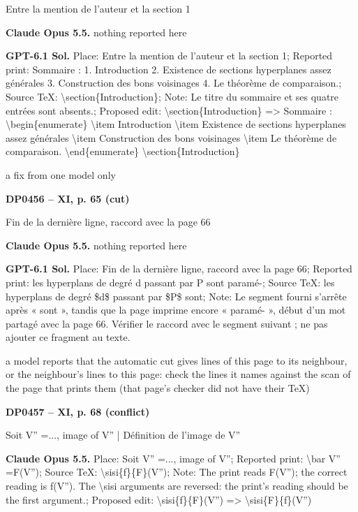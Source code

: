 Entre la mention de l'auteur et la section 1\par
\textbf{Claude Opus 5.5.} nothing reported here\par
\textbf{GPT-6.1 Sol.} Place: Entre la mention de l'auteur et la section 1; Reported print: Sommaire : 1. Introduction 2. Existence de sections hyperplanes assez générales 3. Construction des bons voisinages 4. Le théorème de comparaison.; Source TeX: \textbackslash{}section\{Introduction\}; Note: Le titre du sommaire et ses quatre entrées sont absents.; Proposed edit: \textbackslash{}section\{Introduction\} =\allowbreak > Sommaire : \textbackslash{}begin\{enumerate\} \textbackslash{}item Introduction \textbackslash{}item Existence de sections hyperplanes assez générales \textbackslash{}item Construction des bons voisinages \textbackslash{}item Le théorème de comparaison. \textbackslash{}end\{enumerate\}  \textbackslash{}section\{Introduction\}\par
a fix from one model only\par
\par\noindent\hypertarget{DP0456}{}\textbf{DP0456 -- XI, p. 65 (cut)}\par
Fin de la dernière ligne, raccord avec la page 66\par
\textbf{Claude Opus 5.5.} nothing reported here\par
\textbf{GPT-6.1 Sol.} Place: Fin de la dernière ligne, raccord avec la page 66; Reported print: les hyperplans de degré d passant par P sont paramé-; Source TeX: les hyperplans de degré \$d\$ passant par \$P\$ sont; Note: Le segment fourni s'arrête après « sont », tandis que la page imprime encore « paramé- », début d'un mot partagé avec la page 66. Vérifier le raccord avec le segment suivant ; ne pas ajouter ce fragment au texte.\par
a model reports that the automatic cut gives lines of this page to its neighbour, or the neighbour's lines to this page: check the lines it names against the scan of the page that prints them (that page's checker did not have their TeX)\par
\par\noindent\hypertarget{DP0457}{}\textbf{DP0457 -- XI, p. 68 (conflict)}\par
Soit V'' =\allowbreak  ..., image of V'' | Définition de l'image de V''\par
\textbf{Claude Opus 5.5.} Place: Soit V'' =\allowbreak  ..., image of V''; Reported print: \textbackslash{}bar V'' =\allowbreak  F(V''); Source TeX: \textbackslash{}sisi\{f\}\{F\}(V''); Note: The print reads F(V''); the correct reading is f(V''). The \textbackslash{}sisi arguments are reversed: the print's reading should be the first argument.; Proposed edit: \textbackslash{}sisi\{f\}\{F\}(V'') =\allowbreak > \textbackslash{}sisi\{F\}\{f\}(V'')\par
